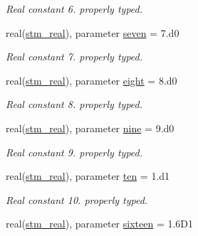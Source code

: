 \begin{CompactItemize}
\begin{CompactList}\small\item\em Real constant 6. properly typed. \item\end{CompactList}\item 
\hypertarget{a00071_9d7e4d561177be6815152f155a45e5be}{
real(\hyperlink{a00071_be430a25ddbcfe29c5bd13189b85de5d}{stm\_\-real}), parameter \hyperlink{a00071_9d7e4d561177be6815152f155a45e5be}{seven} = 7.d0}
\label{a00071_9d7e4d561177be6815152f155a45e5be}

\begin{CompactList}\small\item\em Real constant 7. properly typed. \item\end{CompactList}\item 
\hypertarget{a00071_d458f25f5132a6f901b65a5b64bdb4b3}{
real(\hyperlink{a00071_be430a25ddbcfe29c5bd13189b85de5d}{stm\_\-real}), parameter \hyperlink{a00071_d458f25f5132a6f901b65a5b64bdb4b3}{eight} = 8.d0}
\label{a00071_d458f25f5132a6f901b65a5b64bdb4b3}

\begin{CompactList}\small\item\em Real constant 8. properly typed. \item\end{CompactList}\item 
\hypertarget{a00071_0793df38e4b277ca68e61185ab582ee3}{
real(\hyperlink{a00071_be430a25ddbcfe29c5bd13189b85de5d}{stm\_\-real}), parameter \hyperlink{a00071_0793df38e4b277ca68e61185ab582ee3}{nine} = 9.d0}
\label{a00071_0793df38e4b277ca68e61185ab582ee3}

\begin{CompactList}\small\item\em Real constant 9. properly typed. \item\end{CompactList}\item 
\hypertarget{a00071_a32564ee3e0dece52647e11f1e3a49bb}{
real(\hyperlink{a00071_be430a25ddbcfe29c5bd13189b85de5d}{stm\_\-real}), parameter \hyperlink{a00071_a32564ee3e0dece52647e11f1e3a49bb}{ten} = 1.d1}
\label{a00071_a32564ee3e0dece52647e11f1e3a49bb}

\begin{CompactList}\small\item\em Real constant 10. properly typed. \item\end{CompactList}\item 
\hypertarget{a00071_8b1d02069a7f01925d638850063ecd01}{
real(\hyperlink{a00071_be430a25ddbcfe29c5bd13189b85de5d}{stm\_\-real}), parameter \hyperlink{a00071_8b1d02069a7f01925d638850063ecd01}{sixteen} = 1.6D1}
\label{a00071_8b1d02069a7f01925d638850063ecd01}


\end{CompactItemize}
